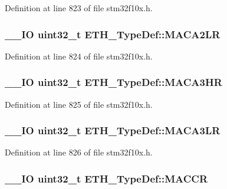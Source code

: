 Definition at line 823 of file stm32f10x.\-h.

\hypertarget{struct_e_t_h___type_def_ae9332525bb7ec86518eecf7153caef19}{
\subsubsection[{M\-A\-C\-A2\-L\-R}]{\setlength{\rightskip}{0pt plus 5cm}\-\_\-\-\_\-\-I\-O {\bf uint32\-\_\-t} E\-T\-H\-\_\-\-Type\-Def\-::\-M\-A\-C\-A2\-L\-R}}\label{struct_e_t_h___type_def_ae9332525bb7ec86518eecf7153caef19}


Definition at line 824 of file stm32f10x.\-h.

\hypertarget{struct_e_t_h___type_def_ad4dd976fada7085d87aa017f160e70d4}{
\subsubsection[{M\-A\-C\-A3\-H\-R}]{\setlength{\rightskip}{0pt plus 5cm}\-\_\-\-\_\-\-I\-O {\bf uint32\-\_\-t} E\-T\-H\-\_\-\-Type\-Def\-::\-M\-A\-C\-A3\-H\-R}}\label{struct_e_t_h___type_def_ad4dd976fada7085d87aa017f160e70d4}


Definition at line 825 of file stm32f10x.\-h.

\hypertarget{struct_e_t_h___type_def_af31f33c1487ae0ee89ac427d9f0f037d}{
\subsubsection[{M\-A\-C\-A3\-L\-R}]{\setlength{\rightskip}{0pt plus 5cm}\-\_\-\-\_\-\-I\-O {\bf uint32\-\_\-t} E\-T\-H\-\_\-\-Type\-Def\-::\-M\-A\-C\-A3\-L\-R}}\label{struct_e_t_h___type_def_af31f33c1487ae0ee89ac427d9f0f037d}


Definition at line 826 of file stm32f10x.\-h.

\hypertarget{struct_e_t_h___type_def_a68d7e7c68b5b8adcf7b2b96bc1eea7d9}{
\subsubsection[{M\-A\-C\-C\-R}]{\setlength{\rightskip}{0pt plus 5cm}\-\_\-\-\_\-\-I\-O {\bf uint32\-\_\-t} E\-T\-H\-\_\-\-Type\-Def\-::\-M\-A\-C\-C\-R}}\label{struct_e_t_h___type_def_a68d7e7c68b5b8adcf7b2b96bc1eea7d9}



